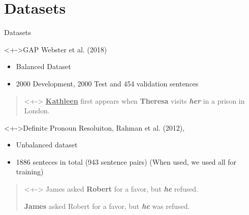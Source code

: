 \message{ !name(presentation.tex)}\documentclass[10pt]{beamer}
\begin{document}
\section{Datasets}
\begin{frame}{Datasets}
  \pause
  \begin{block}<+->{GAP Webster et al. (2018)\cite{webster2018gap}}
    \begin{itemize}
    \item<+-> Balanced Dataset
    \item<+-> 2000 Development, 2000 Test and 454 validation sentences
    \end{itemize}

    \begin{quote}<+->
      \textbf{\underline{Kathleen}} first appears when \textbf{Theresa} visits \textbf{\textit{her}} in a prison in London.
    \end{quote}
  \end{block}

  \begin{block}<+->{Definite Pronoun Resoluiton, Rahman et al. (2012), \cite{rahman2012resolving}}
    \begin{itemize}
    \item<+-> Unbalanced dataset
    \item<+-> 1886 senteces in total (943 sentence pairs) (When used, we used all for training)
    \end{itemize}

    \begin{quote}<+->
       James asked \textbf{Robert} for a favor, but \textit{\textbf{he}} refused.

       \textbf{James} asked Robert for a favor, but \textit{\textbf{he}} was refused.
      
    \end{quote}
  \end{block}

\end{frame}
\end{document}
